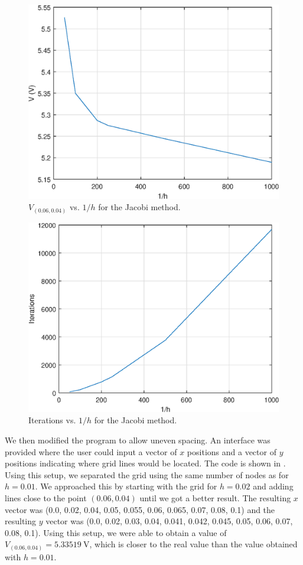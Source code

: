 \documentclass[journal,hidelinks]{IEEEtran}
\begin{document}
\begin{figure}[!htb]
  \centering
  \includegraphics[width=0.6\columnwidth]{question-3/h_v_jacobi.eps}
  \caption{$V_{(0.06,0.04)}$ vs. $1/h$ for the Jacobi method.}
  \label{fig:q3-h-v-jacobi}
\end{figure}

\begin{figure}[!htb]
  \centering
  \includegraphics[width=0.6\columnwidth]{question-3/h_iter_jacobi.eps}
  \caption{Iterations vs. $1/h$ for the Jacobi method.}
  \label{fig:q3-h-iter-jacobi}
\end{figure}

We then modified the program to allow uneven spacing. An interface was provided where the user could input a vector of $x$ positions and a vector of $y$ positions indicating where grid lines would be located. The code is shown in . Using this setup, we separated the grid using the same number of nodes as for $h = 0.01$. We approached this by starting with the grid for $h = 0.02$ and adding lines close to the point $(0.06, 0.04)$ until we got a better result. The resulting $x$ vector was (0.0, 0.02, 0.04, 0.05, 0.055, 0.06, 0.065, 0.07, 0.08, 0.1) and the resulting $y$ vector was (0.0, 0.02, 0.03, 0.04, 0.041, 0.042, 0.045, 0.05, 0.06, 0.07, 0.08, 0.1). Using this setup, we were able to obtain a value of $V_{(0.06,0.04)} = \SI{5.33519}{\volt}$, which is closer to the real value than the value obtained with $h = 0.01$.
\end{document}

